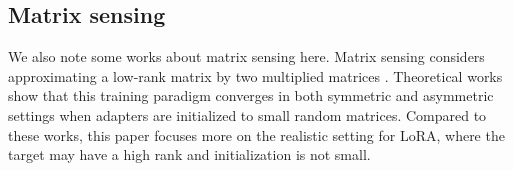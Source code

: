 \subsection{Matrix sensing}
We also note some works about matrix sensing here. Matrix sensing considers approximating a low-rank matrix by two multiplied matrices \cite{chi2019nonconvex}. Theoretical works show that this training paradigm converges in both symmetric \cite{tarmoun2021understanding,min2021explicit} and asymmetric \cite{ye2021global,wind2023asymmetric} settings when adapters are initialized to small random matrices. Compared to these works, this paper focuses more on the realistic setting for LoRA, where the target may have a high rank and initialization is not small. 








